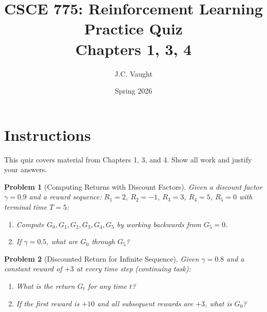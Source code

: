 \documentclass[11pt]{article}
\title{\textbf{CSCE 775: Reinforcement Learning} \\ Practice Quiz \\ Chapters 1, 3, 4}
\author{J.C. Vaught}
\date{Spring 2026}
\newtheorem{problem}{Problem}
\theoremstyle{definition}
\begin{document}
\maketitle

\section*{Instructions}
This quiz covers material from Chapters 1, 3, and 4. Show all work and justify your answers.

\newpage

\begin{problem}[Computing Returns with Discount Factors]
Given a discount factor $\gamma = 0.9$ and a reward sequence: $R_1 = 2$, $R_2 = -1$, $R_3 = 3$, $R_4 = 5$, $R_5 = 0$ with terminal time $T = 5$:
\begin{enumerate}[label=(\alph*)]
    \item Compute $G_0, G_1, G_2, G_3, G_4, G_5$ by working backwards from $G_5 = 0$.
    \item If $\gamma = 0.5$, what are $G_0$ through $G_5$?
\end{enumerate}
\end{problem}

\vfill
\newpage

\begin{problem}[Discounted Return for Infinite Sequence]
Given $\gamma = 0.8$ and a constant reward of $+3$ at every time step (continuing task):
\begin{enumerate}[label=(\alph*)]
    \item What is the return $G_t$ for any time $t$?
    \item If the first reward is $+10$ and all subsequent rewards are $+3$, what is $G_0$?
\end{enumerate}
\end{problem}

\vfill
\newpage
\end{document}

